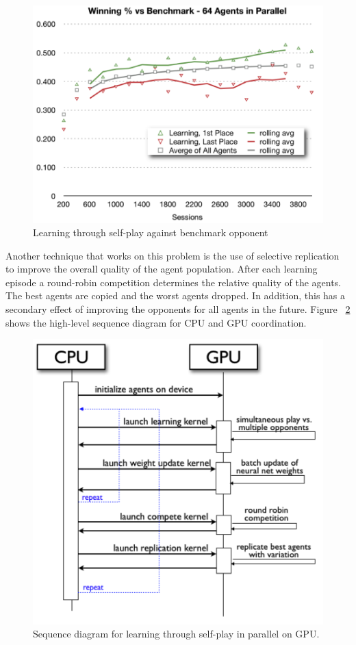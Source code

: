 \begin{figure}[hbtp]
\center
\includegraphics[scale=0.8]{fig18}
\caption{Learning through self-play against benchmark opponent}
\label{fig:learn_v_benchmark}
\end{figure}
\begin{flushleft}


Another technique that works on this problem is the use of selective replication to improve the overall quality of the agent population.  After each learning episode a round-robin competition determines the relative quality of the agents.  The best agents are copied and the worst agents dropped.  In addition, this has a secondary effect of improving the opponents for all agents in the future.  Figure ~\ref{fig:seq_diag_self_play} shows the high-level sequence diagram for CPU and GPU coordination.

\end{flushleft}
\begin{figure}[hbtp]
\center
\includegraphics[scale=0.8]{fig19}
\caption{Sequence diagram for learning through self-play in parallel on GPU.}
\label{fig:seq_diag_self_play}
\end{figure}
